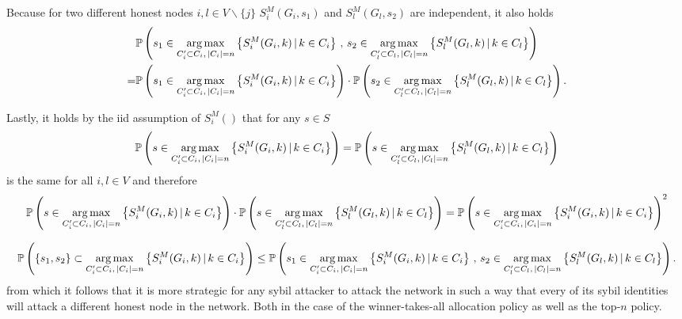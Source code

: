 \begin{remark}[]
\noindent{}Because for two different honest nodes $i,l\in{}V\backslash\lbrace{}j\rbrace$ $S^M_i(G_i,s_1)$ and $S^M_l(G_l,s_2)$ are independent, it also holds
\begin{align*}
 & \mathbb{P}\left(s_1\in\operatorname*{arg\,max}\limits_{C_i'\subset{}C_i,\,|C_i|=n}\left\lbrace{}S_i^M(G_i,k)\,|\,k\in{}C_i\right\rbrace\,,\,s_2\in\operatorname*{arg\,max}\limits_{C_l'\subset{}C_l,\,|C_l|=n}\left\lbrace{}S_l^M(G_l,k)\,|\,k\in{}C_l\right\rbrace\right) \\ =& \mathbb{P}\left(s_1\in\operatorname*{arg\,max}\limits_{C_i'\subset{}C_i,\,|C_i|=n}\left\lbrace{}S_i^M(G_i,k)\,|\,k\in{}C_i\right\rbrace\right) \cdot \mathbb{P}\left(s_2\in\operatorname*{arg\,max}\limits_{C_l'\subset{}C_l,\,|C_l|=n}\left\lbrace{}S_l^M(G_l,k)\,|\,k\in{}C_l\right\rbrace\right).
\end{align*}

\noindent{}Lastly, it holds by the iid assumption of $S^M_i()$ that for any $s\in{}S$ 
\[
\mathbb{P}\left(s\in\operatorname*{arg\,max}\limits_{C_i'\subset{}C_i,\,|C_i|=n}\left\lbrace{}S_i^M(G_i,k)\,|\,k\in{}C_i\right\rbrace\right) = \mathbb{P}\left(s\in\operatorname*{arg\,max}\limits_{C_l'\subset{}C_l,\,|C_l|=n}\left\lbrace{}S_l^M(G_l,k)\,|\,k\in{}C_l\right\rbrace\right)
\]
\noindent{}is the same for all $i,l\in{}V$ and therefore
\[
\mathbb{P}\left(s\in\operatorname*{arg\,max}\limits_{C_i'\subset{}C_i,\,|C_i|=n}\left\lbrace{}S_i^M(G_i,k)\,|\,k\in{}C_i\right\rbrace\right) \cdot \mathbb{P}\left(s\in\operatorname*{arg\,max}\limits_{C_l'\subset{}C_l,\,|C_l|=n}\left\lbrace{}S_l^M(G_l,k)\,|\,k\in{}C_l\right\rbrace\right) = \mathbb{P}\left(s\in\operatorname*{arg\,max}\limits_{C_i'\subset{}C_i,\,|C_i|=n}\left\lbrace{}S_i^M(G_i,k)\,|\,k\in{}C_i\right\rbrace\right)^2
\]


\[
\mathbb{P}\left(\lbrace{}s_1,s_2\rbrace\subset\operatorname*{arg\,max}\limits_{C_i'\subset{}C_i,\,|C_i|=n}\left\lbrace{}S_i^M(G_i,k)\,|\,k\in{}C_i\right\rbrace\right) \leq \mathbb{P}\left(s_1\in\operatorname*{arg\,max}\limits_{C_i'\subset{}C_i,\,|C_i|=n}\left\lbrace{}S_i^M(G_i,k)\,|\,k\in{}C_i\right\rbrace\,,\,s_2\in\operatorname*{arg\,max}\limits_{C_l'\subset{}C_l,\,|C_l|=n}\left\lbrace{}S_l^M(G_l,k)\,|\,k\in{}C_l\right\rbrace\right).
\]
\noindent{}from which it follows that it is more strategic for any sybil attacker to attack the network in such a way that every of its sybil identities will attack a different honest node in the network. Both in the case of the winner-takes-all allocation policy as well as the top-$n$ policy. \vspace{1em}\\
\end{remark}

